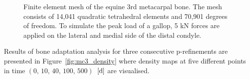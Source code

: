 \documentclass[twocolumn]{svjour3}
\begin{document}
% 
\begin{figure}[h]
	\begin{center}
		\caption{Finite element mesh of the equine 3rd metacarpal bone. The mesh consists of 14,041 quadratic tetrahedral elements and 70,901 degrees of freedom. To simulate the peak load of a gallop, 5 kN forces are applied on the lateral and medial side of the distal condyle.}
		\label{fig:mc3_BC}
	\end{center}
\end{figure}
% 
Results of bone adaptation analysis for three consecutive p-refinements are presented in Figure~\ref{fig:mc3_density} where density maps at five different points in time $(\text{0, 10, 40, 100, 500})$~$[\text d]$ are visualised. 
\end{document}
